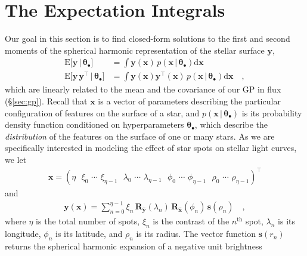 \documentclass[modern]{aastex62}
\begin{document}
\section{The Expectation Integrals}
\label{sec:integrals}

Our goal in this section is to find closed-form solutions to the
first and second moments of the spherical harmonic representation of the
stellar surface $\mathbf{y}$,
%
\begin{align}
    \label{eq:exp_y_app}
    \mathrm{E} \Big[ \mathbf{y} \, \Big| \, \pmb{\theta}_\bullet \Big]
     & =
    \int \mathbf{y}(\mathbf{x} ) \, p(\mathbf{x} \, \big| \, \pmb{\theta}_\bullet)\mathrm{d}\mathbf{x}
    \\
    \label{eq:exp_yy_app}
    \mathrm{E} \Big[ \mathbf{y} \, \mathbf{y}^\top \, \Big| \, \pmb{\theta}_\bullet \Big]
     & =
    \int \mathbf{y}(\mathbf{x} ) \mathbf{y}^\top(\mathbf{x} ) \, p(\mathbf{x} \, \big| \, \pmb{\theta}_\bullet)\mathrm{d}\mathbf{x}
    \quad,
\end{align}
%
which are linearly related to the mean and the covariance of our GP in flux
(\S\ref{sec:gp}).
%
Recall that $\mathbf{x}$ is a vector of parameters describing the particular
configuration of features on the surface of a star, and
$p(\mathbf{x} \, \big| \, \pmb{\theta}_\bullet)$ is its probability
density function conditioned on hyperparameters $\pmb{\theta}_\bullet$,
which describe the \emph{distribution} of the features on the surface
of one or many stars.
%
As we are specifically interested in modeling the effect of star spots
on stellar light curves, we let
%
\begin{align}
    \mathbf{x} =
    \left(
    \eta \,\,\,\,
    \xi_0 \,\, \cdots \,\, \xi_{\eta-1} \,\,\,\,
    \lambda_0 \,\, \cdots \,\, \lambda_{\eta-1} \,\,\,\,
    \phi_0 \,\, \cdots \,\, \phi_{\eta-1} \,\,\,\,
    \rho_0 \,\, \cdots \,\, \rho_{\eta-1}
    \right)^\top
\end{align}
%
and
%
\begin{align}
    \label{eq:RRs}
    \mathbf{y}(\mathbf{x}) =
    \sum_{n=0}^{\eta-1}
    \xi_n
    \,
    \mathbf{R}_{\hat{\mathbf{y}}}(\lambda_n)
    \,
    \mathbf{R}_{\hat{\mathbf{x}}}(\phi_n)
    \,
    \mathbf{s}(\rho_n)
    \quad,
\end{align}
%
where $\eta$ is the total number of spots,
$\xi_n$ is the contrast of the $n^\mathrm{th}$ spot,
$\lambda_n$ is its longitude, $\phi_n$ is its latitude,
and $\rho_n$ is its radius.
The vector function $\mathbf{s}(r_n)$
returns the spherical harmonic expansion of a negative unit brightness
\end{document}
